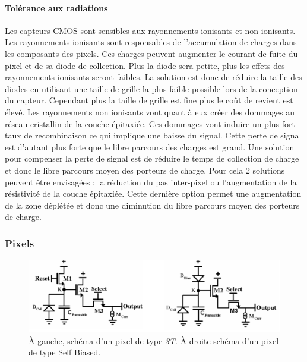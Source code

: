   \paragraph{Tol\'erance aux radiations}
  \label{sect:tolrerance_rad}
  Les capteurs CMOS sont sensibles aux rayonnements ionisants et non-ionisants. Les rayonnements ionisants sont responsables de l'accumulation de charges dans les composants des pixels. Ces charges peuvent augmenter le courant de fuite du pixel et de sa diode de collection. Plus la diode sera petite, plus les effets des rayonnements ionisants seront faibles. La solution est donc de réduire la taille des diodes en utilisant une taille de grille la plus faible possible lors de la conception du capteur. Cependant plus la taille de grille est fine plus le co\^ut de revient est \'elev\'e. Les rayonnements non ionisants vont quant \`a eux cr\'eer des dommages au r\'eseau cristallin de la couche \'epitaxi\'ee. Ces dommages vont induire un plus fort taux de recombinaison ce qui implique une baisse du signal. Cette perte de signal est d'autant plus forte que le libre parcours des charges est grand. Une solution pour compenser la perte de signal est de r\'eduire le temps de collection de charge et donc le libre parcours moyen des porteurs de charge. Pour cela 2 solutions peuvent \^etre envisag\'ees : la réduction du pas inter-pixel ou l'augmentation de la r\'esistivité de la couche \'epitaxi\'ee. Cette dernière option permet une augmentation de la zone d\'epl\'et\'ee et donc une diminution du libre parcours moyen des porteurs de charge.
  
  
  \subsubsection{Pixels}
  
  \begin{figure}[!htb]
    \begin{center}
      \includegraphics[scale=0.5]{./figures/pixel_transistors.png}
      \caption{\`A gauche, sch\'ema d'un pixel de type \textit{3T}. \`A droite sch\'ema d'un pixel de type Self Biased.}
      \label{fig:pixel_transistor}
    \end{center}
  \end{figure}
  
